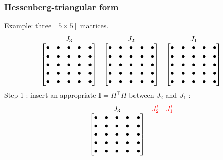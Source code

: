 \begin{frame}
  \frametitle{Hessenberg-triangular form}
  {\color{green}Example:} three $[5\times 5]$ matrices.
  \[
  \begin{matrix}
    J_3 & J_2 & J_1 \\
    \begin{bmatrix}
      \uch & \uch & \uch & \uch & \uch \\
      \uch & \uch & \uch & \uch & \uch \\
      \uch & \uch & \uch & \uch & \uch \\
      \uch & \uch & \uch & \uch & \uch \\
      \uch & \uch & \uch & \uch & \uch \\
    \end{bmatrix}
    &
    \begin{bmatrix}
      \uch & \uch & \uch & \uch & \uch \\
      \uch & \uch & \uch & \uch & \uch \\
      \uch & \uch & \uch & \uch & \uch \\
      \uch & \uch & \uch & \uch & \uch \\
      \uch & \uch & \uch & \uch & \uch \\
    \end{bmatrix}
    &
    \begin{bmatrix}
      \uch & \uch & \uch & \uch & \uch \\
      \uch & \uch & \uch & \uch & \uch \\
      \uch & \uch & \uch & \uch & \uch \\
      \uch & \uch & \uch & \uch & \uch \\
      \uch & \uch & \uch & \uch & \uch \\
    \end{bmatrix}
  \end{matrix}
  \]
  {\color{green} Step 1} :
  insert an appropriate $\mathbf{I}=H^\top H$ between $J_2$ and $J_1$ :
  \[
  \begin{matrix}
    J_3 & {\color{red} J'_2} & {\color{red} J'_1} \\
    \begin{bmatrix}
      \uch & \uch & \uch & \uch & \uch \\
      \uch & \uch & \uch & \uch & \uch \\
      \uch & \uch & \uch & \uch & \uch \\
      \uch & \uch & \uch & \uch & \uch \\
      \uch & \uch & \uch & \uch & \uch \\

\end{bmatrix}
\end{matrix}\]
\end{frame}
